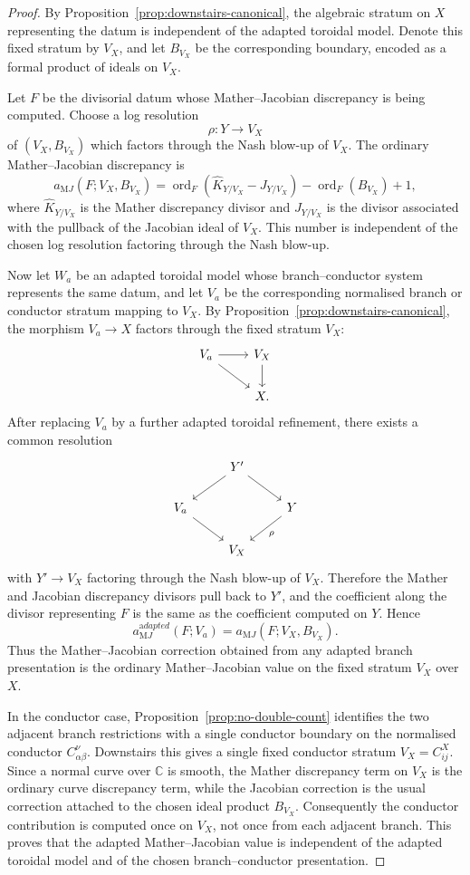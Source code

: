 \documentclass[11pt]{amsart}
\numberwithin{equation}{section}
\theoremstyle{plain}
\theoremstyle{definition}
\newcommand{\ord}{\operatorname{ord}}
\begin{document}
\begin{proof}
By Proposition~\ref{prop:downstairs-canonical}, the algebraic stratum on $X$ representing the datum is independent of the adapted toroidal model. Denote this fixed stratum by \(V_X\), and let \(B_{V_X}\) be the corresponding boundary, encoded as a formal product of ideals on \(V_X\).

Let \(F\) be the divisorial datum whose Mather--Jacobian discrepancy is being computed. Choose a log resolution
\[
\rho:Y\longrightarrow V_X
\]
of \((V_X,B_{V_X})\) which factors through the Nash blow-up of \(V_X\). The ordinary Mather--Jacobian discrepancy is
\[
a_{\mathrm MJ}(F;V_X,B_{V_X})
=
\ord_F(\widehat K_{Y/V_X}-J_{Y/V_X})
-
\ord_F(B_{V_X})
+
1,
\]
where \(\widehat K_{Y/V_X}\) is the Mather discrepancy divisor and \(J_{Y/V_X}\) is the divisor associated with the pullback of the Jacobian ideal of \(V_X\). This number is independent of the chosen log resolution factoring through the Nash blow-up.

Now let \(W_a\) be an adapted toroidal model whose branch--conductor system represents the same datum, and let \(V_a\) be the corresponding normalised branch or conductor stratum mapping to \(V_X\). By Proposition~\ref{prop:downstairs-canonical}, the morphism \(V_a\to X\) factors through the fixed stratum \(V_X\):
\[
\begin{tikzcd}
V_a \arrow[dr] \arrow[r] & V_X \arrow[d]\\
& X.
\end{tikzcd}
\]
After replacing \(V_a\) by a further adapted toroidal refinement, there exists a common resolution
\[
\begin{tikzcd}
& Y' \arrow[dl] \arrow[dr] &\\
V_a \arrow[dr] && Y \arrow[dl,"\rho"]\\
& V_X &
\end{tikzcd}
\]
with \(Y'\to V_X\) factoring through the Nash blow-up of \(V_X\). Therefore the Mather and Jacobian discrepancy divisors pull back to \(Y'\), and the coefficient along the divisor representing \(F\) is the same as the coefficient computed on \(Y\). Hence
\[
a_{\mathrm MJ}^{\mathrm adapted}(F;V_a)
=
a_{\mathrm MJ}(F;V_X,B_{V_X}).
\]
Thus the Mather--Jacobian correction obtained from any adapted branch presentation is the ordinary Mather--Jacobian value \cite{dFD,IshiiMather,EI} on the fixed stratum \(V_X\) over \(X\).

In the conductor case, Proposition~\ref{prop:no-double-count} identifies the two adjacent branch restrictions with a single conductor boundary on the normalised conductor \(C_{\alpha\beta}^{\nu}\). Downstairs this gives a single fixed conductor stratum \(V_X=C_{ij}^X\). Since a normal curve over \(\mathbb C\) is smooth, the Mather discrepancy term on \(V_X\) is the ordinary curve discrepancy term, while the Jacobian correction is the usual correction attached to the chosen ideal product \(B_{V_X}\). Consequently the conductor contribution is computed once on \(V_X\), not once from each adjacent branch. This proves that the adapted Mather--Jacobian value is independent of the adapted toroidal model and of the chosen branch--conductor presentation.
\end{proof}
\end{document}
